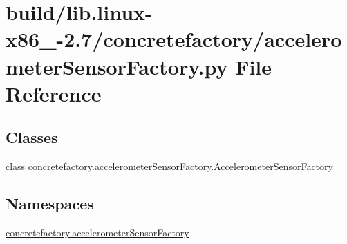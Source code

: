 \hypertarget{build_2lib_8linux-x86__64-2_87_2concretefactory_2accelerometerSensorFactory_8py}{}\section{build/lib.linux-\/x86\+\_-\/2.7/concretefactory/accelerometer\+Sensor\+Factory.py File Reference}
\label{build_2lib_8linux-x86__64-2_87_2concretefactory_2accelerometerSensorFactory_8py}
\subsection*{Classes}
\begin{DoxyCompactItemize}
\item 
class \hyperlink{classconcretefactory_1_1accelerometerSensorFactory_1_1AccelerometerSensorFactory}{concretefactory.\+accelerometer\+Sensor\+Factory.\+Accelerometer\+Sensor\+Factory}
\end{DoxyCompactItemize}
\subsection*{Namespaces}
\begin{DoxyCompactItemize}
\item 
 \hyperlink{namespaceconcretefactory_1_1accelerometerSensorFactory}{concretefactory.\+accelerometer\+Sensor\+Factory}
\end{DoxyCompactItemize}
